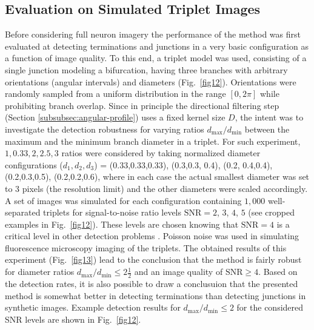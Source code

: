 \subsection{Evaluation on Simulated Triplet Images}
\label{subsec:experiments-triplets}
Before considering full neuron imagery the performance of the method was first evaluated at detecting terminations and junctions in a very basic configuration as a function of image quality. To this end, a triplet model was used, consisting of a single junction modeling a bifurcation, having three branches with arbitrary orientations (angular intervals) and diameters (Fig.~\ref{fig12}). Orientations were randomly sampled from a uniform distribution in the range $[0, 2\pi]$ while prohibiting branch overlap. Since in principle the directional filtering step (Section \ref{subsubsec:angular-profile}) uses a fixed kernel size $D$, the intent was to investigate the detection robustness for varying ratios $d_{\max}/d_{\min}$ between the maximum and the minimum branch diameter in a triplet. For such experiment, $1,0.33,2,2.5,3$ ratios were considered by taking normalized diameter configurations ($d_1,d_2,d_3$) = (0.33,0.33,0.33), (0.3,0.3, 0.4), (0.2, 0.4,0.4), (0.2,0.3,0.5), (0.2,0.2,0.6), where in each case the actual smallest diameter was set to 3 pixels (the resolution limit) and the other diameters were scaled accordingly. A set of images was simulated for each configuration containing $1,000$ well-separated triplets for signal-to-noise ratio levels $\textrm{SNR}=2$, $3$, $4$, $5$ (see cropped examples in Fig.~\ref{fig12}). These levels are chosen knowing that $\textrm{SNR}=4$ is a critical level in other detection problems \cite{smal2010quantitative, chenouard2014objective}. Poisson noise was used in simulating fluorescence microscopy imaging of the triplets. The obtained results of this experiment (Fig.~\ref{fig13}) lead to the conclusion that the method is fairly robust for diameter ratios $d_{\max}/d_{\min}\leq2\frac{1}{2}$ and an image quality of $\textrm{SNR} \geq 4$. Based on the detection rates, it is also possible to draw a conclusuion that the presented method is somewhat better in detecting terminations than detecting junctions in synthetic images. Example detection results for $d_{\max}/d_{\min}\leq2$ for the considered SNR levels are shown in Fig.~\ref{fig12}.

